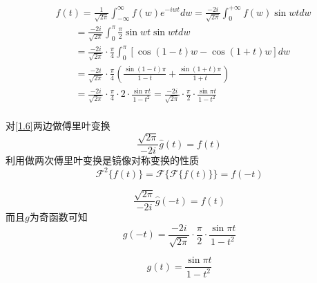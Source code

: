 \documentclass[12pt,a4paper]{article}
\numberwithin{subsection}{section}   %
\numberwithin{subsubsection}{subsection}
\theoremstyle{plain}
\theoremstyle{definition}
\theoremstyle{remark}
\theoremstyle{remark}
\begin{document}
\begin{equation}
	\begin{aligned}
		& f(t)=\frac{1}{\sqrt{2\pi}}\int_{-\infty}^{\infty} f(w)e^{-iwt}dw=\frac{-2i}{\sqrt{2\pi}}\int_0^{+\infty}f(w)\sin w t dw \\[8pt]
		&\qquad=\frac{-2i}{\sqrt{2\pi}}\int_0^\pi \frac{\pi}{2}\sin w t\sin w t dw \\[8pt]
		&\qquad=\frac{-2i}{\sqrt{2\pi}}\cdot\frac{\pi}{4}\int_0^\pi [\cos(1-t)w-\cos(1+t)w] dw \\[8pt]
		&\qquad=\frac{-2i}{\sqrt{2\pi}}\cdot\frac{\pi}{4}\left( \frac{\sin(1-t)\pi}{1-t}+\frac{\sin(1+t)\pi}{1+t} \right) \\[8pt]
		&\qquad=\frac{-2i}{\sqrt{2\pi}}\cdot\frac{\pi}{4}\cdot 2\cdot\frac{\sin\pi t}{1-t^2}=\frac{-2i}{\sqrt{2\pi}}\cdot\frac{\pi}{2}\cdot\frac{\sin \pi t}{1-t^2} \\
	\end{aligned}
\end{equation}

对\eqref{1.6}两边做傅里叶变换
\begin{equation}
	\frac{\sqrt{2\pi}}{-2i} \hat{g}(t) = f(t)
\end{equation}
利用做两次傅里叶变换是镜像对称变换的性质
\begin{equation}\label{2f}
	\mathcal{F}^{2}\{f(t)\} = \mathcal{F}\{\mathcal{F}\{f(t)\}\} = f(-t)
\end{equation}

\begin{equation}
	\frac{\sqrt{2\pi}}{-2i} \hat{g}(-t) = \hat{f}(t)
\end{equation}
而且\(g\)为奇函数可知
\begin{equation}
	g(-t) = \frac{-2i}{\sqrt{2\pi}} \cdot \frac{\pi}{2} \cdot \frac{\sin \pi t}{1 - t^2}
\end{equation}

\begin{equation}
	g(t) = \frac{\sin\pi t}{1 - t^2}
\end{equation}
			
\end{document}
